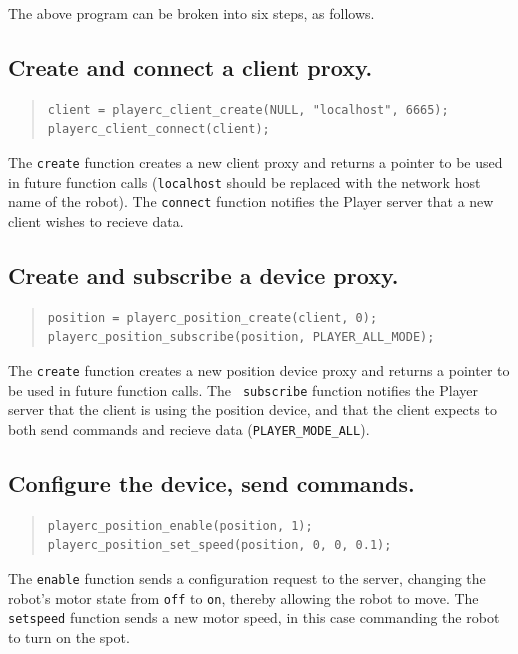 \documentclass[11pt]{report}
\begin{document}
The above program can be broken into six steps, as follows.

\subsection*{Create and connect a client proxy.}

\begin{quote}\begin{verbatim}
client = playerc_client_create(NULL, "localhost", 6665);
playerc_client_connect(client);
\end{verbatim}\end{quote}
The {\tt create} function creates a new client proxy and returns a
pointer to be used in future function calls ({\tt localhost} should be
replaced with the network host name of the robot).  The {\tt connect}
function notifies the Player server that a new client wishes to
recieve data.

\subsection*{Create and subscribe a device proxy.}

\begin{quote}\begin{verbatim}
position = playerc_position_create(client, 0);
playerc_position_subscribe(position, PLAYER_ALL_MODE);
\end{verbatim}\end{quote}
The {\tt create} function creates a new position device proxy and
returns a pointer to be used in future function calls.  The {\tt
subscribe} function notifies the Player server that the client is
using the position device, and that the client expects to both send
commands and recieve data ({\tt PLAYER\_MODE\_ALL}).

\subsection*{Configure the device, send commands.}

\begin{quote}\begin{verbatim}
playerc_position_enable(position, 1);
playerc_position_set_speed(position, 0, 0, 0.1);
\end{verbatim}\end{quote}
The {\tt enable} function sends a configuration request to the server,
changing the robot's motor state from {\tt off} to {\tt on}, thereby
allowing the robot to move.  The {\tt setspeed} function sends a new
motor speed, in this case commanding the robot to turn on the spot.
\end{document}
